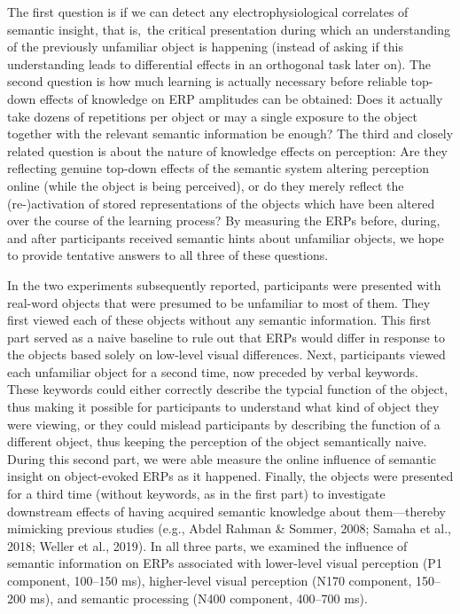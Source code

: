 \documentclass[
  english,
  doc,12pt,twoside,floatsintext]{apa7}
\begin{document}
The first question is if we can detect any electrophysiological correlates of semantic insight, that is,~the critical presentation during which an understanding of the previously unfamiliar object is happening (instead of asking if this understanding leads to differential effects in an orthogonal task later on). The second question is how much learning is actually necessary before reliable top-down effects of knowledge on ERP amplitudes can be obtained: Does it actually take dozens of repetitions per object or may a single exposure to the object together with the relevant semantic information be enough? The third and closely related question is about the nature of knowledge effects on perception: Are they reflecting genuine top-down effects of the semantic system altering perception online (while the object is being perceived), or do they merely reflect the (re-)activation of stored representations of the objects which have been altered over the course of the learning process? By measuring the ERPs before, during, and after participants received semantic hints about unfamiliar objects, we hope to provide tentative answers to all three of these questions.

In the two experiments subsequently reported, participants were presented with real-word objects that were presumed to be unfamiliar to most of them. They first viewed each of these objects without any semantic information. This first part served as a naive baseline to rule out that ERPs would differ in response to the objects based solely on low-level visual differences. Next, participants viewed each unfamiliar object for a second time, now preceded by verbal keywords. These keywords could either correctly describe the typcial function of the object, thus making it possible for participants to understand what kind of object they were viewing, or they could mislead participants by describing the function of a different object, thus keeping the perception of the object semantically naive. During this second part, we were able measure the online influence of semantic insight on object-evoked ERPs as it happened. Finally, the objects were presented for a third time (without keywords, as in the first part) to investigate downstream effects of having acquired semantic knowledge about them---thereby mimicking previous studies (e.g., Abdel Rahman \& Sommer, 2008; Samaha et al., 2018; Weller et al., 2019). In all three parts, we examined the influence of semantic information on ERPs associated with lower-level visual perception (P1 component, 100--150 ms), higher-level visual perception (N170 component, 150--200 ms), and semantic processing (N400 component, 400--700 ms).
\end{document}
